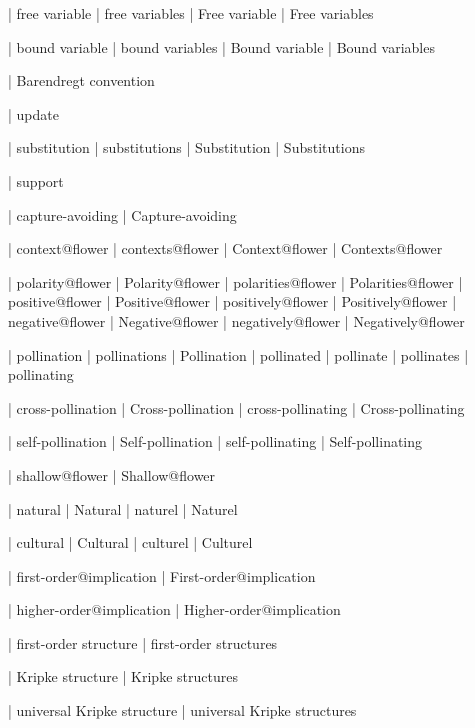  | free variable
 | free variables
 | Free variable
 | Free variables

 | bound variable
 | bound variables
 | Bound variable
 | Bound variables

 | Barendregt convention

 | update

 | substitution
 | substitutions
 | Substitution
 | Substitutions

 | support

 | capture-avoiding
 | Capture-avoiding

 | context@flower
 | contexts@flower
 | Context@flower
 | Contexts@flower

 | polarity@flower
 | Polarity@flower
 | polarities@flower
 | Polarities@flower
 | positive@flower
 | Positive@flower
 | positively@flower
 | Positively@flower
 | negative@flower
 | Negative@flower
 | negatively@flower
 | Negatively@flower

 | pollination
 | pollinations
 | Pollination
 | pollinated
 | pollinate
 | pollinates
 | pollinating

 | cross-pollination
 | Cross-pollination
 | cross-pollinating
 | Cross-pollinating

 | self-pollination
 | Self-pollination
 | self-pollinating
 | Self-pollinating

 | shallow@flower
 | Shallow@flower

 | natural
 | Natural
 | naturel
 | Naturel

 | cultural
 | Cultural
 | culturel
 | Culturel
 
 | first-order@implication
 | First-order@implication

 | higher-order@implication
 | Higher-order@implication

 | first-order structure
 | first-order structures

 | Kripke structure
 | Kripke structures

 | universal Kripke structure
 | universal Kripke structures

